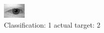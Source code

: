 \begin{figure}[h!]
\begin{center}
\includegraphics[width=0.60\columnwidth]{figures/ID358_class_1_target_2.png}
\end{center}
\caption{ Classification: 1 actual target: 2}
\label{fig:ID358_class_1_target_2}
\end{figure}
